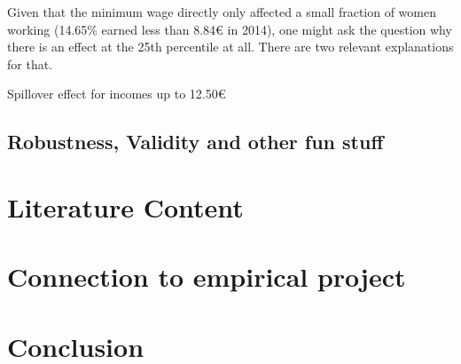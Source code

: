 \documentclass[12pt,draft,a4paper]{article}
\begin{document}

Given that the minimum wage directly only affected a small fraction of women working (14.65\% earned less than 8.84€ in 2014), one might ask the question why there is an effect at the 25th percentile at all. There are two relevant explanations for that. 

Spillover effect for incomes up to 12.50€ \citep{Dustman21Reallocation} 
\subsection{Robustness, Validity and other fun stuff}








\section{Literature Content} %


\section{Connection to empirical project} %

\section{Conclusion}

% 
\newpage

% 

\end{document}
